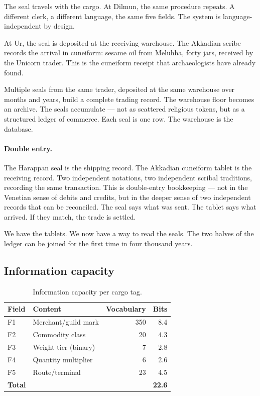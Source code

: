 The seal travels with the cargo. At Dilmun, the same procedure
repeats. A different clerk, a different language, the same five
fields. The system is language-independent by design.

At Ur, the seal is deposited at the receiving warehouse. The
Akkadian scribe records the arrival in cuneiform: sesame oil from
Meluhha, forty jars, received by the Unicorn trader. This is the
cuneiform receipt that archaeologists have already found.

Multiple seals from the same trader, deposited at the same
warehouse over months and years, build a complete trading record.
The warehouse floor becomes an archive. The seals accumulate ---
not as scattered religious tokens, but as a structured ledger of
commerce. Each seal is one row. The warehouse is the database.

\paragraph{Double entry.}
The Harappan seal is the shipping record. The Akkadian cuneiform
tablet is the receiving record. Two independent notations, two
independent scribal traditions, recording the same transaction.
This is double-entry bookkeeping --- not in the Venetian sense
of debits and credits, but in the deeper sense of two independent
records that can be reconciled. The seal says what was sent. The
tablet says what arrived. If they match, the trade is settled.

We have the tablets. We now have a way to read the seals.
The two halves of the ledger can be joined for the first time
in four thousand years.

\subsection{Information capacity}

\begin{longtable}{@{}llrr@{}}
\caption{Information capacity per cargo tag.}
\label{tab:bits}\\
\toprule
Field & Content & Vocabulary & Bits \\
\midrule
\endfirsthead
\bottomrule
\endlastfoot
F1 & Merchant/guild mark & \num{350} & \num{8.4} \\
\midrule
F2 & Commodity class & \num{20} & \num{4.3} \\
\midrule
F3 & Weight tier (binary) & \num{7} & \num{2.8} \\
\midrule
F4 & Quantity multiplier & \num{6} & \num{2.6} \\
\midrule
F5 & Route/terminal & \num{23} & \num{4.5} \\
\midrule
\textbf{Total} & & & \textbf{\num{22.6}} \\
\end{longtable}

